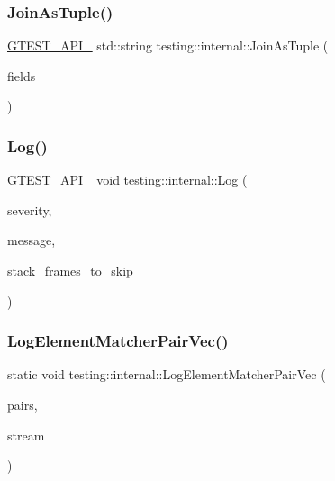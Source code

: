 \mbox{\label{namespacetesting_1_1internal_a4ffe5309bf49f08145ed010a6d244e41}} 
\subsubsection{\texorpdfstring{JoinAsTuple()}{JoinAsTuple()}}
{\footnotesize\ttfamily \mbox{\hyperlink{gtest-port_8h_aa73be6f0ba4a7456180a94904ce17790}{G\+T\+E\+S\+T\+\_\+\+A\+P\+I\+\_\+}} std\+::string testing\+::internal\+::\+Join\+As\+Tuple (\begin{DoxyParamCaption}\item[{const \mbox{\hyperlink{namespacetesting_1_1internal_a50003bb76ec2934be1062be11efba8bf}{Strings}} \&}]{fields }\end{DoxyParamCaption})}

\mbox{\label{namespacetesting_1_1internal_a8a57ce0412334a3f487bbaa8321febbe}} 
\subsubsection{\texorpdfstring{Log()}{Log()}}
{\footnotesize\ttfamily \mbox{\hyperlink{gtest-port_8h_aa73be6f0ba4a7456180a94904ce17790}{G\+T\+E\+S\+T\+\_\+\+A\+P\+I\+\_\+}} void testing\+::internal\+::\+Log (\begin{DoxyParamCaption}\item[{\mbox{\hyperlink{namespacetesting_1_1internal_a203d1a8a2147a53d12bbdae40d443914}{Log\+Severity}}}]{severity,  }\item[{const std\+::string \&}]{message,  }\item[{int}]{stack\+\_\+frames\+\_\+to\+\_\+skip }\end{DoxyParamCaption})}

\mbox{\label{namespacetesting_1_1internal_a7e3ffe5f66db16c3ab89de55eac65bfa}} 
\subsubsection{\texorpdfstring{LogElementMatcherPairVec()}{LogElementMatcherPairVec()}}
{\footnotesize\ttfamily static void testing\+::internal\+::\+Log\+Element\+Matcher\+Pair\+Vec (\begin{DoxyParamCaption}\item[{const Element\+Matcher\+Pairs \&}]{pairs,  }\item[{\+::std\+::ostream $\ast$}]{stream }\end{DoxyParamCaption})\hspace{0.3cm}{\ttfamily [static]}}

